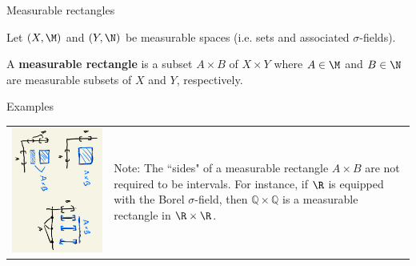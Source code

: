 \documentclass[10pt]{beamer}
\newcommand{\sfs}{$\sigma$-fields}
\begin{document}
\begin{frame}{Measurable rectangles}

Let $(X,\M)$ and $(Y,\N)$ be measurable spaces (i.e. sets and associated \sfs).

\begin{definition}
 A \textbf{measurable rectangle} is a subset $A \times B$ of $X \times Y$ where $A \in \M$ and $B \in \N$ are measurable subsets of $X$ and $Y$, respectively.
\end{definition}
%

\begin{block}{Examples}
 \begin{tabular}{cl}
\includegraphics[width=.4\textwidth, angle=90]{images/measurable_rectangles}	&
 \parbox[b]{0.4\linewidth}{Note: The ``sides" of a measurable rectangle $A \times B$ are not required to be intervals.  For instance, if $\R$ is equipped with the Borel $\sigma$-field, then $\mathbb{Q} \times \mathbb{Q}$ is a measurable rectangle in $\R \times \R$.}
\end{tabular}

\end{block}

\end{frame}
\end{document}
